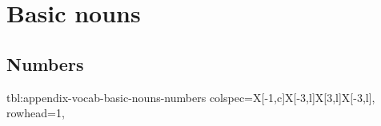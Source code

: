 \documentclass[../nihongo-gakushuu-kyouzai-supplementary.tex]{subfiles}
\begin{document}
\appendix
\setcounter{section}{1}

\section{Basic nouns} \label{sec:appendix-basic-nouns}

\subsection{Numbers}
{tbl:appendix-vocab-basic-nouns-numbers}  %
{
    colspec={X[-1,c]X[-3,l]X[3,l]X[-3,l]},
    rowhead=1,
}  %
\end{document}
